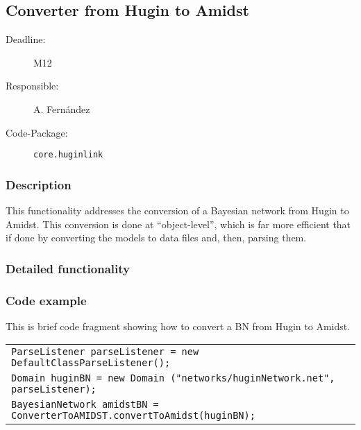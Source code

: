 \newpage
\subsection{Converter from Hugin to Amidst}
\label{ConverterFromHuginToAmidst}

\begin{description}
\item[Deadline:] M12
\item[Responsible:] A. Fern\'andez
\item[Code-Package:] \texttt{core.huginlink}
\end{description}
\subsubsection*{Description}

This functionality addresses the conversion of a Bayesian network from Hugin to Amidst. This conversion is done at ``object-level'', which is far more efficient that if done by converting the models to data files and, then, parsing them. 

\subsubsection*{Detailed functionality}

\vspace{1in}

\subsubsection*{Code example}

This is brief code fragment showing how to convert a BN from Hugin to Amidst. 

\begin{table}[H]
\begin{tabular}{l} \hline

\texttt{ParseListener parseListener = new DefaultClassParseListener();}\\    
\texttt{Domain huginBN = new Domain ("networks/huginNetwork.net", parseListener);}\\
\texttt{BayesianNetwork amidstBN = ConverterToAMIDST.convertToAmidst(huginBN);}\\  \hline 

\end{tabular}
\end{table} 



        
        
        
        
        
